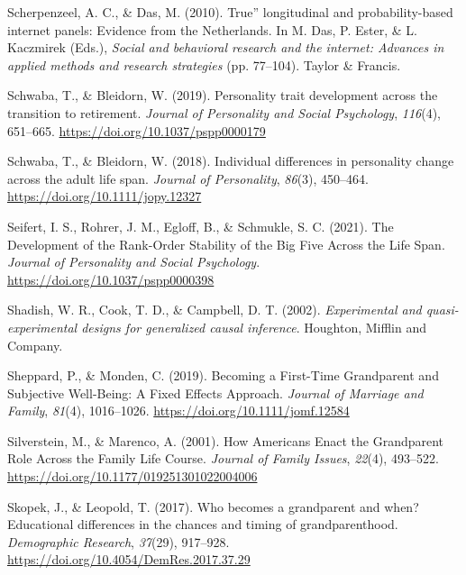 \documentclass[
  english,
  man, noextraspace,floatsintext]{apa7}
\begin{document}
\leavevmode\hypertarget{ref-scherpenzeelTrueLongitudinalProbabilitybased2010}{}%
Scherpenzeel, A. C., \& Das, M. (2010). True'' longitudinal and probability-based internet panels: Evidence from the Netherlands. In M. Das, P. Ester, \& L. Kaczmirek (Eds.), \emph{Social and behavioral research and the internet: Advances in applied methods and research strategies} (pp. 77--104). Taylor \& Francis.

\leavevmode\hypertarget{ref-schwabaPersonalityTraitDevelopment2019}{}%
Schwaba, T., \& Bleidorn, W. (2019). Personality trait development across the transition to retirement. \emph{Journal of Personality and Social Psychology}, \emph{116}(4), 651--665. \url{https://doi.org/10.1037/pspp0000179}

\leavevmode\hypertarget{ref-schwabaIndividualDifferencesPersonality2018}{}%
Schwaba, T., \& Bleidorn, W. (2018). Individual differences in personality change across the adult life span. \emph{Journal of Personality}, \emph{86}(3), 450--464. \url{https://doi.org/10.1111/jopy.12327}

\leavevmode\hypertarget{ref-seifertDevelopmentRankOrderStability2021}{}%
Seifert, I. S., Rohrer, J. M., Egloff, B., \& Schmukle, S. C. (2021). The Development of the Rank-Order Stability of the Big Five Across the Life Span. \emph{Journal of Personality and Social Psychology}. \url{https://doi.org/10.1037/pspp0000398}

\leavevmode\hypertarget{ref-shadishExperimentalQuasiexperimentalDesigns2002}{}%
Shadish, W. R., Cook, T. D., \& Campbell, D. T. (2002). \emph{Experimental and quasi-experimental designs for generalized causal inference}. Houghton, Mifflin and Company.

\leavevmode\hypertarget{ref-sheppardBecomingFirstTimeGrandparent2019}{}%
Sheppard, P., \& Monden, C. (2019). Becoming a First-Time Grandparent and Subjective Well-Being: A Fixed Effects Approach. \emph{Journal of Marriage and Family}, \emph{81}(4), 1016--1026. \url{https://doi.org/10.1111/jomf.12584}

\leavevmode\hypertarget{ref-silversteinHowAmericansEnact2001}{}%
Silverstein, M., \& Marenco, A. (2001). How Americans Enact the Grandparent Role Across the Family Life Course. \emph{Journal of Family Issues}, \emph{22}(4), 493--522. \url{https://doi.org/10.1177/019251301022004006}

\leavevmode\hypertarget{ref-skopekWhoBecomesGrandparent2017}{}%
Skopek, J., \& Leopold, T. (2017). Who becomes a grandparent and when? Educational differences in the chances and timing of grandparenthood. \emph{Demographic Research}, \emph{37}(29), 917--928. \url{https://doi.org/10.4054/DemRes.2017.37.29}
\end{document}
